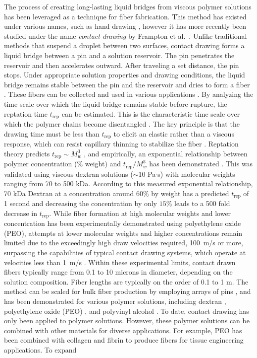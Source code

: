 \documentclass[lineno]{JFM-FLM_Au}
\begin{document}
The process of creating long-lasting liquid bridges from viscous polymer solutions has been leveraged as a technique for fiber fabrication. This method has existed under various names, such as hand drawing \cite{cho_synthesis_2011}, however it has more recently been studied under the name \emph{contact drawing} by Frampton et al.~\cite{frampton_elongation_2015}. Unlike traditional methods that suspend a droplet between two surfaces, contact drawing forms a liquid bridge between a pin and a solution reservoir. The pin penetrates the reservoir and then accelerates outward. After traveling a set distance, the pin stops. Under appropriate solution properties and drawing conditions, the liquid bridge remains stable between the pin and the reservoir and dries to form a fiber \cite{chowdhry_polymer_2021}. These fibers can be collected and used in various applications \cite{verma_multi-pin_2022}. By analyzing the time scale over which the liquid bridge remains stable before rupture, the reptation time $t_{\text{rep}}$ can be estimated. This is the characteristic time scale over which the polymer chains become disentangled \cite{colby_structure_2010}. The key principle is that the drawing time must be less than $t_{\text{rep}}$ to elicit an elastic rather than a viscous response, which can resist capillary thinning to stabilize the fiber \cite{chowdhry_polymer_2021}. Reptation theory predicts $t_{\text{rep}} \sim M_w^3$ \cite{colby_structure_2010}, and empirically, an exponential relationship between polymer concentration (\% weight) and $t_{\text{rep}} / M_w^3$ has been demonstrated \cite{chowdhry_polymer_2021}. This was validated using viscous dextran solutions ($\sim$10 Pa$\cdot$s) with molecular weights ranging from 70 to 500 kDa. According to this measured exponential relationship, 70 kDa Dextran at a concentration around $60\%$ by weight has a predicted $t_{\text{rep}}$ of 1 second and decreasing the concentration by only $15\%$ leads to a 500 fold decrease in $t_{\text{rep}}$. While fiber formation at high molecular weights and lower concentration has been experimentally demonstrated using polyethylene oxide (PEO), attempts at lower molecular weights and higher concentrations remain limited due to the exceedingly high draw velocities required, 100~m/s or more, surpassing the capabilities of typical contact drawing systems, which operate at velocities less than 1~m/s \cite{chowdhry_polymer_2021,verma_multi-pin_2022}. Within these experimental limits, contact drawn fibers typically range from 0.1 to 10 microns in diameter, depending on the solution composition. Fiber lengths are typically on the order of 0.1 to 1 m. The method can be scaled for bulk fiber production by employing arrays of pins \cite{verma_multi-pin_2022}, and has been demonstrated for various polymer solutions, including dextran \cite{chowdhry_polymer_2021}, polyethylene oxide (PEO) \cite{yaghoobi_multifilament_2023}, and polyvinyl alcohol \cite{visser_loading_2022}. To date, contact drawing has only been applied to polymer solutions. However, these polymer solutions can be combined with other materials for diverse applications. For example, PEO has been combined with collagen \cite{yaghoobi_multifilament_2023} and fibrin \cite{verma_nonwoven_2023} to produce fibers for tissue engineering applications. To expand 
\end{document}
